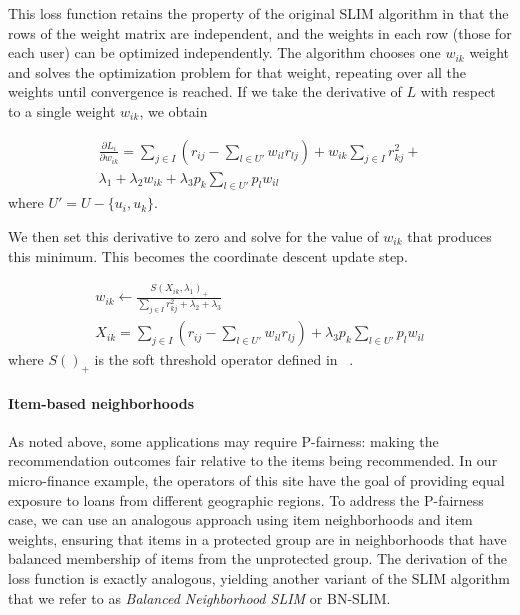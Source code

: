 This loss function retains the property of the original SLIM algorithm in that the rows of the weight matrix are independent, and the weights in each row (those for each user) can be optimized independently. The algorithm chooses one $w_{ik}$ weight and solves the optimization problem for that weight, repeating over all the weights until convergence is reached. If we take the derivative of $L$ with respect to a single weight $w_{ik}$, we obtain

\begin{equation}\label{eq:derivative}
\begin{split}
\frac{\partial L_i}{\partial w_{ik}} = \sum_{j \in I}{(r_{ij} - 
    \sum_{l \in U'}{w_{il}r_{lj}})} + w_{ik}\sum_{j \in I}{r_{kj}^2} +  \\
    \lambda_1 + \lambda_2w_{ik} + \lambda_3p_k\sum_{l \in U'}{p_lw_{il}} 
\end{split}
\end{equation}
where $U' = U - \{u_i, u_k\}$.

We then set this derivative to zero and solve for the value of $w_{ik}$ that produces this minimum. This becomes the coordinate descent update step. 

\begin{equation}\label{eq:update}
\begin{split}
    w_{ik} \leftarrow \frac{S\left(X_{ik}, \lambda_1\right)_+}
    {\sum_{j \in I}{r_{kj}^2} + \lambda_2 + \lambda_3} \\
    X_{ik} = \sum_{j \in I}{(r_{ij} - 
    \sum_{l \in U'}{w_{il}r_{lj}})}+\lambda_3p_k\sum_{l \in U'}{p_lw_{il}}
\end{split}
\end{equation}
where $S()_+$ is the soft threshold operator defined in ~\cite{friedman_pathwise_2007}.

\paragraph{\textbf{Item-based neighborhoods}}

As noted above, some applications may require P-fairness: making the recommendation outcomes fair relative to the items being recommended. In our micro-finance example, the operators of this site have the goal of providing equal exposure to loans from different geographic regions. To address the P-fairness case, we can use an analogous approach using item neighborhoods and item weights, ensuring that items in a protected group are in neighborhoods that have balanced membership of items from the unprotected group. The derivation of the loss function is exactly analogous, yielding another variant of the SLIM algorithm that we refer to as \textit{Balanced Neighborhood SLIM} or BN-SLIM.

